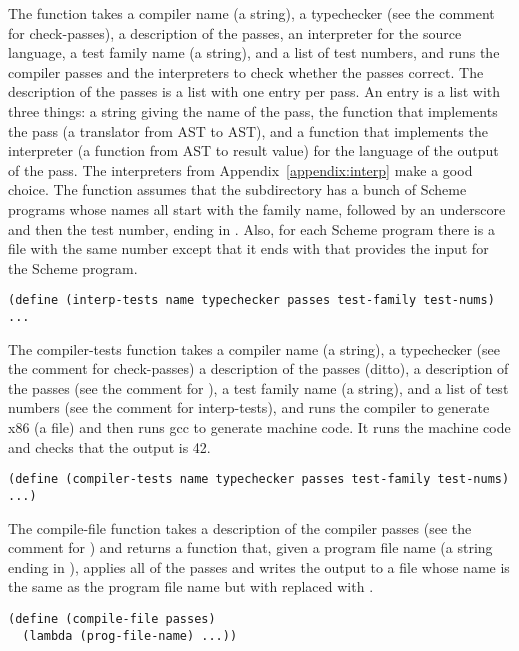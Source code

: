 \documentclass[11pt]{book}
\begin{document}
The  function takes a compiler name (a string), a
typechecker (see the comment for check-passes), a description of the
passes, an interpreter for the source language, a test family name
(a string), and a list of test numbers, and runs the compiler passes
and the interpreters to check whether the passes correct.
The description of the passes is a list with one entry per pass.
An entry is a list with three things: a string giving the name
of the pass, the function that implements the pass (a translator from
AST to AST), and a function that implements the interpreter (a
function from AST to result value) for the language of the output of
the pass.  The interpreters from Appendix~\ref{appendix:interp} make a
good choice.  The  function assumes that the
subdirectory  has a bunch of Scheme programs whose names
all start with the family name, followed by an underscore and then the
test number, ending in . Also, for each Scheme program there
is a file with the same number except that it ends with  that
provides the input for the Scheme program.
\begin{lstlisting}
(define (interp-tests name typechecker passes test-family test-nums) ...
\end{lstlisting}

The compiler-tests function takes a compiler name (a string), a
typechecker (see the comment for check-passes) a description of
the passes (ditto), a description of the passes (see the comment for
), a test family name (a string), and a list of
test numbers (see the comment for interp-tests), and runs the compiler
to generate x86 (a  file) and then runs gcc to generate
machine code.  It runs the machine code and checks that the output is 42.
\begin{lstlisting}
(define (compiler-tests name typechecker passes test-family test-nums) ...)
\end{lstlisting}

The compile-file function takes a description of the compiler passes
(see the comment for ) and returns a function that,
given a program file name (a string ending in ), applies all
of the passes and writes the output to a file whose name is the same
as the program file name but with  replaced with .
\begin{lstlisting}
(define (compile-file passes)
  (lambda (prog-file-name) ...))
\end{lstlisting}
\end{document}
